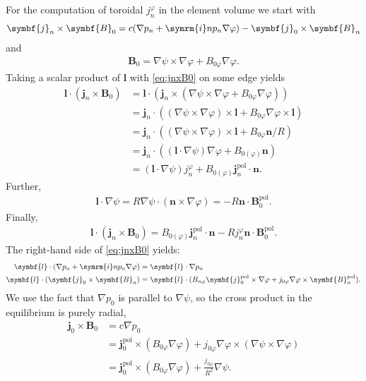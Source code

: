 \documentclass[a4paper, 10pt, english]{article}
\let\temp\vartheta
\let\vartheta\theta
\let\theta\temp
\let\temp\varphi
\let\varphi\phi
\let\phi\temp
\let\vec\symbf
\newcommand*\im{\ensuremath{\symrm{i}}}  %
\newcommand*\pol{\ensuremath{\textrm{pol}}}  %
\begin{document}
For the computation of toroidal $j_{n}^{\phi}$ in the element volume we start with
\begin{gather}
  \vec{j}_{n} \times \vec{B}_{0} = c (\nabla p_{n} + \im n p_{n} \nabla \phi) - \vec{j}_{0} \times \vec{B}_{n} \label{eq:jnxB0}
\end{gather}
and
\begin{gather}
  \vec{B}_{0} = \nabla \psi \times \nabla \phi + B_{0 \phi} \nabla \phi.
\end{gather}
Taking a scalar product of $\vec{l}$ with \cref{eq:jnxB0} on some edge yields
\begin{align}
  \vec{l} \cdot (\vec{j}_{n} \times \vec{B}_{0}) &= \vec{l} \cdot (\vec{j}_{n} \times (\nabla \psi \times \nabla \phi + B_{0 \phi} \nabla \phi)) \nonumber \\
  &= \vec{j}_{n} \cdot ((\nabla \psi \times \nabla \phi) \times \vec{l} + B_{0 \phi} \nabla \phi \times \vec{l}) \nonumber \\
  &= \vec{j}_{n} \cdot ((\nabla \psi \times \nabla \phi) \times \vec{l} + B_{0 \phi} \vec{n} / R) \nonumber \\
  &= \vec{j}_{n} \cdot \left( (\vec{l} \cdot \nabla \psi) \nabla \phi + B_{0 (\phi)} \vec{n} \right) \nonumber \\
  &= (\vec{l} \cdot \nabla \psi) j_{n}^{\phi} + B_{0 (\phi)} \vec{j}_{n}^{\pol} \cdot \vec{n}.
\end{align}
Further,
\begin{gather}
  \vec{l} \cdot \nabla \psi = R \nabla \psi \cdot \left( \vec{n} \times \nabla \phi \right) = -R \vec{n} \cdot \vec{B}_{0}^{\pol}.
\end{gather}
Finally,
\begin{gather}
  \vec{l} \cdot (\vec{j}_{n} \times \vec{B}_{0}) = B_{0 (\phi)} \vec{j}_{n}^{\pol} \cdot \vec{n} - R j_{n}^{\phi} \vec{n} \cdot \vec{B}_{0}^{\pol}.
\end{gather}
The right-hand side of \cref{eq:jnxB0} yields:
\begin{align}
  \vec{l} \cdot (\nabla p_{n} + \im n p_{n} \nabla \phi) &= \vec{l} \cdot \nabla p_{n} \\
  \vec{l} \cdot (\vec{j}_{0} \times \vec{B}_{n}) &= \vec{l} \cdot (B_{n \phi} \vec{j}_{0}^{\pol} \times \nabla \phi + j_{0 \phi} \nabla \phi \times \vec{B}_{n}^{\pol}).
\end{align}
We use the fact that $\nabla p_{0}$ is parallel to $\nabla \psi$, so the cross product in the equilibrium is purely radial,
\begin{align}
  \vec{j}_{0} \times \vec{B}_{0} &= c \nabla p_{0} \nonumber \\
  &= \vec{j}_{0}^{\pol} \times (B_{0 \phi} \nabla \phi) + j_{0 \phi} \nabla \phi \times (\nabla \psi \times \nabla \phi) \nonumber \\
  &= \vec{j}_{0}^{\pol} \times (B_{0 \phi} \nabla \phi) + \frac{j_{0 \phi}}{R^{2}} \nabla \psi.
\end{align}
\end{document}
